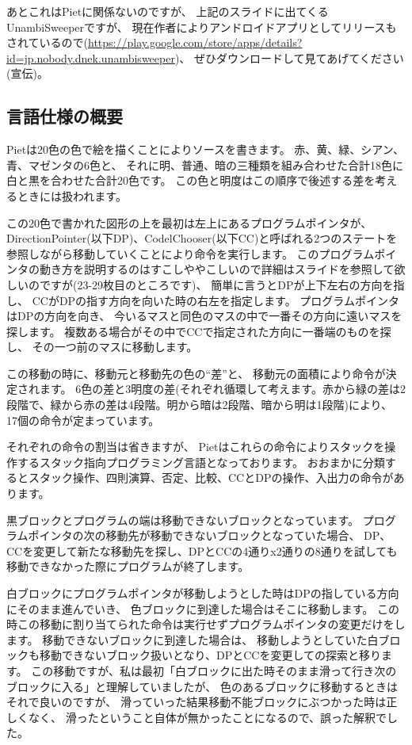 あとこれはPietに関係ないのですが、
上記のスライドに出てくるUnambiSweeperですが、
現在作者によりアンドロイドアプリとしてリリースもされているので(\url{https://play.google.com/store/apps/details?id=jp.nobody.dnek.unambisweeper})、
ぜひダウンロードして見てあげてください(宣伝)。

\subsection{言語仕様の概要}

Pietは20色の色で絵を描くことによりソースを書きます。
赤、黄、緑、シアン、青、マゼンタの6色と、
それに明、普通、暗の三種類を組み合わせた合計18色に白と黒を合わせた合計20色です。
この色と明度はこの順序で後述する差を考えるときには扱われます。

この20色で書かれた図形の上を最初は左上にあるプログラムポインタが、
DirectionPointer(以下DP)、CodelChooser(以下CC)と呼ばれる2つのステートを参照しながら移動していくことにより命令を実行します。
このプログラムポインタの動き方を説明するのはすこしややこしいので詳細はスライドを参照して欲しいのですが(23-29枚目のところです)、
簡単に言うとDPが上下左右の方向を指し、
CCがDPの指す方向を向いた時の右左を指定します。
プログラムポインタはDPの方向を向き、
今いるマスと同色のマスの中で一番その方向に遠いマスを探します。
複数ある場合がその中でCCで指定された方向に一番端のものを探し、
その一つ前のマスに移動します。

この移動の時に、移動元と移動先の色の``差''と、
移動元の面積により命令が決定されます。
6色の差と3明度の差(それぞれ循環して考えます。赤から緑の差は2段階で、緑から赤の差は4段階。明から暗は2段階、暗から明は1段階)により、
17個の命令が定まっています。

それぞれの命令の割当は省きますが、
Pietはこれらの命令によりスタックを操作するスタック指向プログラミング言語となっております。
おおまかに分類するとスタック操作、四則演算、否定、比較、CCとDPの操作、入出力の命令があります。

黒ブロックとプログラムの端は移動できないブロックとなっています。
プログラムポインタの次の移動先が移動できないブロックとなっていた場合、
DP、CCを変更して新たな移動先を探し、DPとCCの4通りx2通りの8通りを試しても移動できなかった際にプログラムが終了します。

白ブロックにプログラムポインタが移動しようとした時はDPの指している方向にそのまま進んでいき、
色ブロックに到達した場合はそこに移動します。
この時この移動に割り当てられた命令は実行せずプログラムポインタの変更だけをします。
移動できないブロックに到達した場合は、
移動しようとしていた白ブロックも移動できないブロック扱いとなり、DPとCCを変更しての探索と移ります。
この移動ですが、私は最初「白ブロックに出た時そのまま滑って行き次のブロックに入る」と理解していましたが、
色のあるブロックに移動するときはそれで良いのですが、
滑っていった結果移動不能ブロックにぶつかった時は正しくなく、
滑ったということ自体が無かったことになるので、誤った解釈でした。

